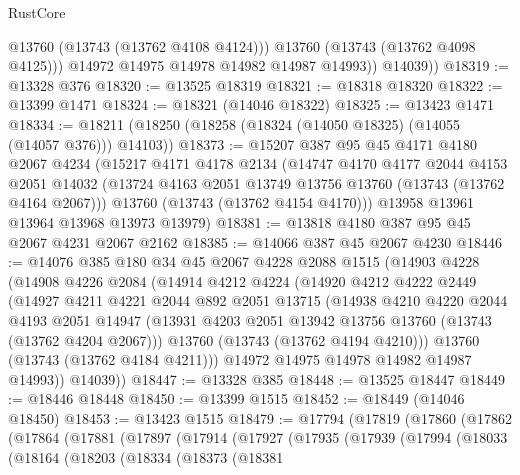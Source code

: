 \begin{lexlean}{RustCore}
\begin{coremodule}
                @13760
                (@13743 (@13762 @4108 @4124)))
              @13760
              (@13743 (@13762 @4098 @4125)))
            @14972
            @14975
            @14978
            @14982
            @14987
            @14993))
        @14039))
@18319 := @13328 @376
@18320 := @13525 @18319
@18321 := @18318 @18320
@18322 := @13399 @1471
@18324 := @18321 (@14046 @18322)
@18325 := @13423 @1471
@18334 := @18211 (@18250 (@18258 (@18324 (@14050 @18325) (@14055 (@14057 @376))) @14103))
@18373 := @15207
    @387
    @95
    @45
    @4171
    @4180
    @2067
    @4234
    (@15217
      @4171
      @4178
      @2134
      (@14747
        @4170
        @4177
        @2044
        @4153
        @2051
        @14032
        (@13724 @4163 @2051 @13749 @13756 @13760 (@13743 (@13762 @4164 @2067)))
        @13760
        (@13743 (@13762 @4154 @4170)))
      @13958
      @13961
      @13964
      @13968
      @13973
      @13979)
@18381 := @13818 @4180 @387 @95 @45 @2067 @4231 @2067 @2162
@18385 := @14066 @387 @45 @2067 @4230
@18446 := @14076
    @385
    @180
    @34
    @45
    @2067
    @4228
    @2088
    @1515
    (@14903
      @4228
      (@14908
        @4226
        @2084
        (@14914
          @4212
          @4224
          (@14920
            @4212
            @4222
            @2449
            (@14927
              @4211
              @4221
              @2044
              @892
              @2051
              @13715
              (@14938
                @4210
                @4220
                @2044
                @4193
                @2051
                @14947
                (@13931 @4203 @2051 @13942 @13756 @13760 (@13743 (@13762 @4204 @2067)))
                @13760
                (@13743 (@13762 @4194 @4210)))
              @13760
              (@13743 (@13762 @4184 @4211)))
            @14972
            @14975
            @14978
            @14982
            @14987
            @14993))
        @14039))
@18447 := @13328 @385
@18448 := @13525 @18447
@18449 := @18446 @18448
@18450 := @13399 @1515
@18452 := @18449 (@14046 @18450)
@18453 := @13423 @1515
@18479 := @17794
    (@17819
      (@17860
        (@17862
          (@17864
            (@17881
              (@17897
                (@17914
                  (@17927
                    (@17935
                      (@17939
                        (@17994
                          (@18033
                            (@18164
                              (@18203
                                (@18334
                                  (@18373
                                    (@18381

\end{coremodule}
\end{lexlean}

